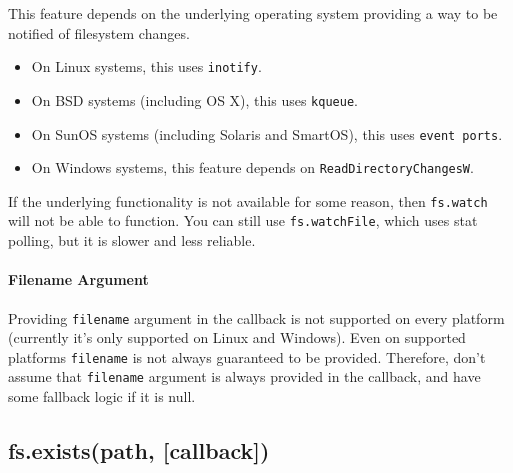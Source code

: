 This feature depends on the underlying operating system providing a way
to be notified of filesystem changes.

\begin{itemize}
\item
  On Linux systems, this uses \texttt{inotify}.
\item
  On BSD systems (including OS X), this uses \texttt{kqueue}.
\item
  On SunOS systems (including Solaris and SmartOS), this uses
  \texttt{event ports}.
\item
  On Windows systems, this feature depends on
  \texttt{ReadDirectoryChangesW}.
\end{itemize}

If the underlying functionality is not available for some reason, then
\texttt{fs.watch} will not be able to function. You can still use
\texttt{fs.watchFile}, which uses stat polling, but it is slower and
less reliable.

\paragraph{Filename Argument}

Providing \texttt{filename} argument in the callback is not supported on
every platform (currently it's only supported on Linux and Windows).
Even on supported platforms \texttt{filename} is not always guaranteed
to be provided. Therefore, don't assume that \texttt{filename} argument
is always provided in the callback, and have some fallback logic if it
is null.

\begin{Shaded}
\begin{Highlighting}[]
\NormalTok{(}\NormalTok{, } 
  \NormalTok{(} 
   
    \NormalTok{(} 
  \NormalTok{\} } \NormalTok{\{}
    \NormalTok{(}\NormalTok{);}
  \NormalTok{\}}
\NormalTok{\});}
\end{Highlighting}
\end{Shaded}

\subsection{fs.exists(path, {[}callback{]})}

